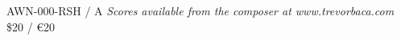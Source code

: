 \documentclass{article}
\begin{document}
\null \vfill

AWN-000-RSH / A \hfill
\textit{Scores available from the composer at www.trevorbaca.com}
\hfill \$20 / \euro 20
\end{document}
